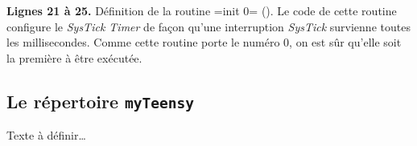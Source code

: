 {\bf Lignes 21 à 25.} Définition de la routine \plm=init 0= (). Le code de cette routine configure le \emph{SysTick Timer} de façon qu'une interruption \emph{SysTick} survienne toutes les millisecondes. Comme cette routine porte le numéro $0$, on est sûr qu'elle soit la première à être exécutée.






\subsection{Le répertoire \texttt{myTeensy}}

Texte à définir…






